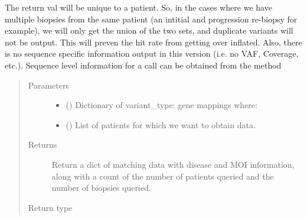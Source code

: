 \documentclass[letterpaper,10pt,english]{sphinxmanual}
\begin{document}
\begin{fulllineitems}
\begin{fulllineitems}
The return val will be unique to a patient. So, in the cases where we
have multiple biopsies from the same patient (an intitial and progression
re-biopsy for example), we will only get the union of the two sets, and
duplicate variants will not be output.  This will preven the hit rate from
getting over inflated.  Also, there is no sequence specific information
output in this version (i.e. no VAF, Coverage, etc.).  Sequence level
information for a call can be obtained from the method {\hyperref[\detokenize{matchbox_api_utils:get-variant-report}]{}}
\begin{quote}\begin{description}
\item[{Parameters}] \leavevmode\begin{itemize}
\item {} 
 () \textendash{} 
Dictionary of variant\_type: gene mappings where:

%
\begin{sphinxVerbatim}[commandchars=\\\{\}]
           
         
\end{sphinxVerbatim}


\item {} 
 () \textendash{} List of patients for which we want to obtain
data.

\end{itemize}

\item[{Returns}] \leavevmode
Return a dict of matching data with disease and MOI information,
along with a count of the number of patients queried and the
number of biopsies queried.

\item[{Return type}] \leavevmode
{}


\end{description}
\end{quote}
\end{fulllineitems}
\end{fulllineitems}
\end{document}
